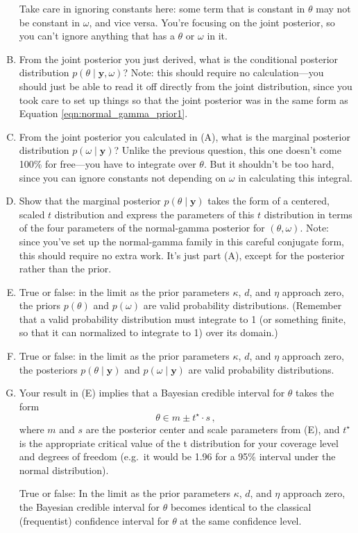\documentclass{mynotes}
\newcommand{\by}{\textbf{y}}
\begin{document}
\begin{enumerate}[(A)]
Take care in ignoring constants here: some term that is constant in $\theta$ may not be constant in $\omega$, and vice versa.  You're focusing on the joint posterior, so you can't ignore anything that has a $\theta$ or $\omega$ in it.


\item From the joint posterior you just derived, what is the conditional posterior distribution $p(\theta \mid \by, \omega)$?  Note: this should require no calculation---you should just be able to read it off directly from the joint distribution, since you took care to set up things so that the joint posterior was in the same form as Equation \ref{eqn:normal_gamma_prior1}.

\item From the joint posterior you calculated in (A), what is the marginal posterior distribution $p(\omega \mid \by)$?  Unlike the previous question, this one doesn't come 100\% for free---you have to integrate over $\theta$.  But it shouldn't be too hard, since you can ignore constants not depending on $\omega$ in calculating this integral.

\item Show that the marginal posterior $p(\theta \mid \by)$ takes the form of a centered, scaled $t$ distribution and express the parameters of this $t$ distribution in terms of the four parameters of the normal-gamma posterior for $(\theta, \omega)$.  Note: since you've set up the normal-gamma family in this careful conjugate form, this should require no extra work.  It's just part (A), except for the posterior rather than the prior.

\item True or false: in the limit as the prior parameters $\kappa$, $d$, and $\eta$ approach zero, the priors $p(\theta)$ and $p(\omega)$ are valid probability distributions.  (Remember that a valid probability distribution must integrate to 1 (or something finite, so that it can normalized to integrate to 1) over its domain.)

\item True or false: in the limit as the prior parameters $\kappa$, $d$, and $\eta$ approach zero, the posteriors $p(\theta \mid \by)$ and $p(\omega \mid \by)$ are valid probability distributions.

\item Your result in (E) implies that a Bayesian credible interval for $\theta$ takes the form
$$
\theta \in m \pm t^{\star} \cdot s \, ,
$$
where $m$ and $s$ are the posterior center and scale parameters from (E), and $t^\star$ is the appropriate critical value of the t distribution for your coverage level and degrees of freedom (e.g.~it would be 1.96 for a 95\% interval under the normal distribution).

True or false: In the limit as the prior parameters $\kappa$, $d$, and $\eta$ approach zero, the Bayesian credible interval for $\theta$ becomes identical to the classical (frequentist) confidence interval for $\theta$ at the same confidence level.

\end{enumerate}
\end{document}

